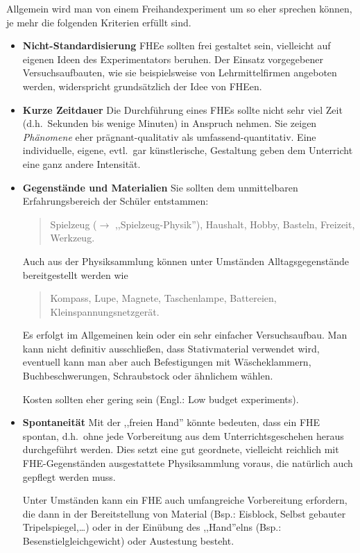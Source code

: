 Allgemein wird man von einem Freihandexperiment um so eher sprechen
k\"{o}nnen, je mehr die folgenden Kriterien erf\"{u}llt sind.
\begin{itemize}
	\item
	{\bf Nicht-Standardisierung}
	FHEe sollten frei gestaltet sein, vielleicht auf eigenen Ideen
	des Experimentators beruhen.
	Der Einsatz vorgegebener Versuchsaufbauten, wie sie
	beispielsweise von Lehrmittelfirmen angeboten werden,
	widerspricht grunds\"{a}tzlich der Idee von FHEen.
	\item
	{\bf Kurze Zeitdauer}
	Die Durchf\"{u}hrung eines FHEs sollte nicht sehr viel Zeit
	(d.h.\ Sekunden bis wenige Minuten) in Anspruch nehmen.
	Sie zeigen {\it Ph\"{a}nomene} eher pr\"{a}gnant-qualitativ als
	umfassend-quantitativ.
	\mip
	Eine individuelle, eigene, evtl.\ gar k\"{u}nstlerische, Gestaltung
	geben dem Unterricht eine ganz andere Intensit\"{a}t.
	
	\item
	{\bf Gegenst\"{a}nde und Materialien}
	Sie sollten dem unmittelbaren Erfahrungsbereich der
	Sch\"{u}ler entstammen:
	\begin{quote}
		Spielzeug ($\to$ ,,Spielzeug-Physik''), Haushalt, Hobby,
		Basteln, Freizeit, Werkzeug.
	\end{quote}
	Auch aus der Physiksammlung k\"{o}nnen unter Umst\"{a}nden
	Alltagsgegenst\"{a}nde bereitgestellt werden wie
	\begin{quote}
		Kompass, Lupe, Magnete, Taschenlampe, Battereien, Kleinspannungsnetzger\"{a}t.
	\end{quote}
	
	\mip
	Es erfolgt im Allgemeinen kein oder ein sehr
	einfacher Versuchsaufbau.
	Man kann nicht definitiv ausschlie{\ss}en, dass
	Stativmaterial verwendet wird, eventuell kann man
	aber auch Befestigungen mit W\"{a}scheklammern,
	Buchbeschwerungen, Schraubstock oder \"{a}hnlichem w\"{a}hlen.
	
	\mip
	Kosten sollten eher gering sein (Engl.: Low budget experiments).
	
	\item
	{\bf Spontaneit\"{a}t} Mit der ,,freien Hand'' k\"{o}nnte bedeuten,
	dass ein FHE spontan, d.h.\ ohne jede Vorbereitung aus dem
	Unterrichtsgeschehen heraus durchgef\"{u}hrt werden.
	Dies setzt eine gut geordnete, vielleicht reichlich mit
	FHE-Gegenst\"{a}nden ausgestattete Physiksammlung voraus,
	die nat\"{u}rlich auch gepflegt werden muss.
	
	\mip
	Unter Umst\"{a}nden kann ein FHE auch umfangreiche Vorbereitung
	erfordern, die dann in der Bereitstellung von
	Material
	(Bsp.: Eisblock, Selbst gebauter Tripelspiegel,\dots)
	oder in der Ein\"{u}bung des ,,Hand''elns
	(Bsp.: Besenstielgleichgewicht) oder Austestung besteht.
	

\end{itemize}
